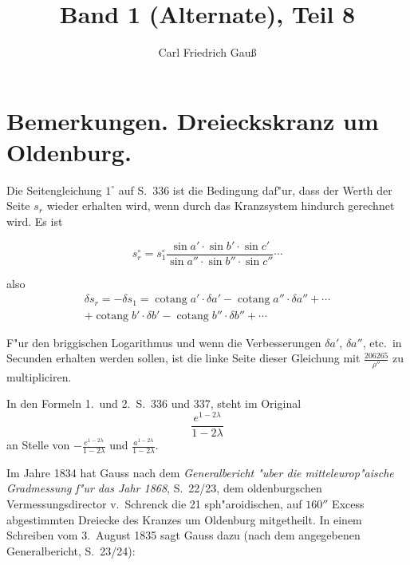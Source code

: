 \documentclass[12pt,a4paper]{article}
\title{Band 1 (Alternate), Teil 8}
\author{Carl Friedrich Gau\ss}
\date{}
\DeclareMathOperator{\cotang}{cotang}
\theoremstyle{plain}
\theoremstyle{definition}
\theoremstyle{remark}
\begin{document}
\maketitle

\section*{Bemerkungen. Dreieckskranz um Oldenburg.}

Die Seitengleichung $1^{\circ}$ auf S.~336 ist die Bedingung daf"ur, dass der Werth der Seite $s_r$ wieder erhalten wird, wenn durch das Kranzsystem hindurch gerechnet wird. Es ist

\begin{equation*}
s_r^{\circ} = s_1^{\circ} \frac{\sin a' \cdot \sin b' \cdot \sin c'}{\sin a'' \cdot \sin b'' \cdot \sin c''} \cdots
\end{equation*}

also
\begin{multline*}
\delta s_r = -\delta s_1 = \cotang a' \cdot \delta a' - \cotang a'' \cdot \delta a'' + \cdots \\
+ \cotang b' \cdot \delta b' - \cotang b'' \cdot \delta b'' + \cdots
\end{multline*}

F"ur den briggischen Logarithmus und wenn die Verbesserungen $\delta a'$, $\delta a''$, etc.\ in Secunden erhalten werden sollen, ist die linke Seite dieser Gleichung mit $\frac{206265}{\rho''}$ zu multipliciren.

In den Formeln 1.\ und 2.\ S.~336 und 337, steht im Original
\[\frac{e^{1-2\lambda}}{1-2\lambda}\]
an Stelle von $-\frac{e^{1-2\lambda}}{1-2\lambda}$ und $\frac{a^{1-2\lambda}}{1-2\lambda}$.

Im Jahre 1834 hat Gauss nach dem \emph{Generalbericht "uber die mitteleurop"aische Gradmessung f"ur das Jahr 1868}, S.~22/23, dem oldenburgschen Vermessungsdirector v.~Schrenck die 21 sph"aroidischen, auf $160''$ Excess abgestimmten Dreiecke des Kranzes um Oldenburg mitgetheilt. In einem Schreiben vom 3.~August 1835 sagt Gauss dazu (nach dem angegebenen Generalbericht, S.~23/24):
\end{document}

